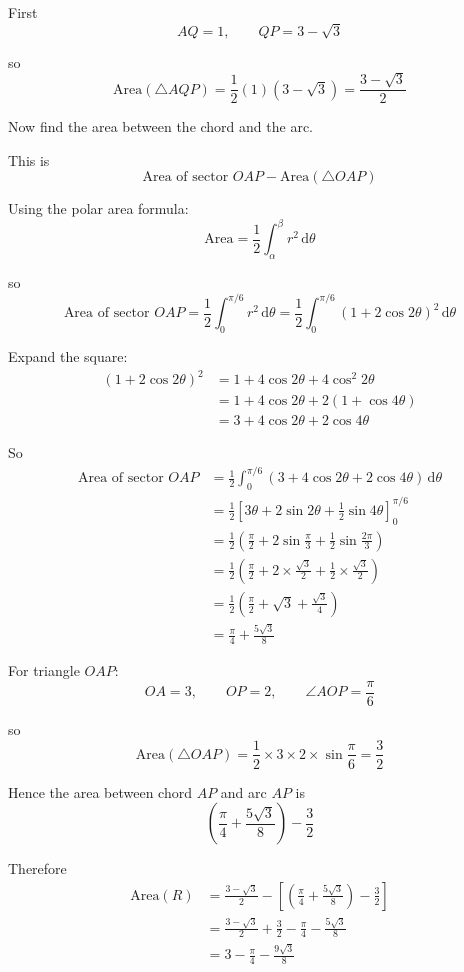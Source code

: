 \documentclass[leqno]{article}
\begin{document}
\begin{enumerate}[
  label=\textbf{\arabic*.},
  leftmargin=*,
  topsep=0pt,
  partopsep=0pt,
  parsep=0pt
]
\begin{djsSolution}
\begin{enumerate}[label=\textbf{(\alph*)}]
First
\[
AQ=1,\qquad QP=3-\sqrt3
\]

so
\[
\text{Area}(\triangle AQP)=\frac12(1)(3-\sqrt3)=\frac{3-\sqrt3}{2}
\]

Now find the area between the chord and the arc.

This is
\[
\text{Area of sector }OAP-\text{Area}(\triangle OAP)
\]

Using the polar area formula:
\[
\text{Area}=\frac12\int_{\alpha}^{\beta} r^2\,\mathrm{d}\theta
\]

so
\[
\text{Area of sector }OAP=\frac12\int_0^{\pi/6} r^2\,\mathrm{d}\theta
=\frac12\int_0^{\pi/6}(1+2\cos 2\theta)^2\,\mathrm{d}\theta
\]

Expand the square:
\begin{align*}
(1+2\cos 2\theta)^2
&=1+4\cos 2\theta+4\cos^2 2\theta \\
&=1+4\cos 2\theta+2(1+\cos 4\theta) \\
&=3+4\cos 2\theta+2\cos 4\theta
\end{align*}

So
\begin{align*}
\text{Area of sector }OAP
&=\frac12\int_0^{\pi/6}\left(3+4\cos 2\theta+2\cos 4\theta\right)\,\mathrm{d}\theta \\
&=\frac12\left[3\theta+2\sin 2\theta+\frac12\sin 4\theta\right]_0^{\pi/6} \\
&=\frac12\left(\frac{\pi}{2}+2\sin\frac{\pi}{3}+\frac12\sin\frac{2\pi}{3}\right) \\
&=\frac12\left(\frac{\pi}{2}+2\times \frac{\sqrt3}{2}+\frac12\times \frac{\sqrt3}{2}\right) \\
&=\frac12\left(\frac{\pi}{2}+\sqrt3+\frac{\sqrt3}{4}\right) \\
&=\frac{\pi}{4}+\frac{5\sqrt3}{8}
\end{align*}

For triangle \(OAP\):
\[
OA=3,\qquad OP=2,\qquad \angle AOP=\frac{\pi}{6}
\]

so
\[
\text{Area}(\triangle OAP)=\frac12\times 3\times 2\times \sin\frac{\pi}{6}=\frac32
\]

Hence the area between chord \(AP\) and arc \(AP\) is
\[
\left(\frac{\pi}{4}+\frac{5\sqrt3}{8}\right)-\frac32
\]

Therefore
\begin{align*}
\text{Area}(R)
&=\frac{3-\sqrt3}{2}-\left[\left(\frac{\pi}{4}+\frac{5\sqrt3}{8}\right)-\frac32\right] \\
&=\frac{3-\sqrt3}{2}+\frac32-\frac{\pi}{4}-\frac{5\sqrt3}{8} \\
&=3-\frac{\pi}{4}-\frac{9\sqrt3}{8}
\end{align*}
\end{enumerate}
\end{djsSolution}



\end{enumerate}
\end{document}
